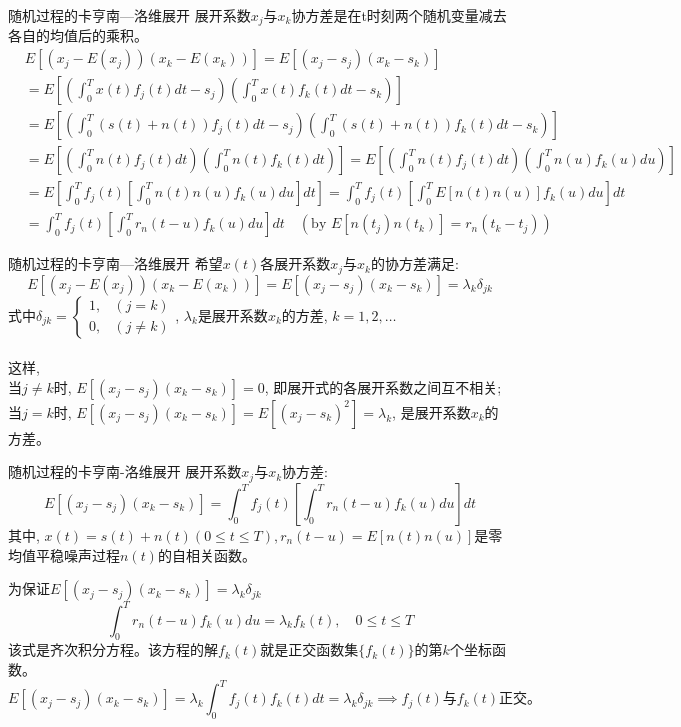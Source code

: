 \begin{frame}[shrink]{随机过程的卡亨南---洛维展开}
展开系数$x_j$与$x_k$协方差是在t时刻两个随机变量减去各自的均值后的乘积。
\begin{align*}
&E[(x_j-E(x_j))(x_k-E(x_k))]=E[(x_j-s_j)(x_k-s_k)]\\
&=E\left[\left(\int_{0}^{T}x(t)f_j(t)dt-s_j\right)\left(\int_{0}^{T}x(t)f_k(t)dt-s_k\right)\right]\\
&=E\left[\left(\int_{0}^{T}(s(t)+n(t))f_j(t)dt-s_j\right)\left(\int_{0}^{T}(s(t)+n(t))f_k(t)dt-s_k\right)\right]\\
&=E\left[\left(\int_{0}^{T}n(t)f_j(t)dt\right)\left(\int_{0}^{T}n(t)f_k(t)dt\right)\right]=E\left[\left(\int_{0}^{T}n(t)f_j(t)dt\right)\left(\int_{0}^{T}n(u)f_k(u)du\right)\right]\\
&=E\left[\int_{0}^{T}f_j(t)\left[\int_{0}^{T}n(t)n(u)f_k(u)du\right]dt\right]=\int_{0}^{T}f_j(t)\left[\int_{0}^{T}E[n(t)n(u)]f_k(u)du\right]dt\\
&=\int_{0}^{T}f_j(t)\left[\int_{0}^{T}r_n(t-u)f_k(u)du\right]dt\quad (\text{by }E[n(t_j)n(t_k)]=r_n(t_k-t_j))
\end{align*}
\end{frame}

\begin{frame}{随机过程的卡亨南---洛维展开}
希望$x(t)$各展开系数$x_j$与$x_k$的协方差满足:
\[E[(x_j-E(x_j))(x_k-E(x_k))]=E[(x_j-s_j)(x_k-s_k)]=\lambda_k\delta_{jk} \]
式中$\delta_{jk}=
\begin{cases}
1, & (j=k)\\
0, & (j\ne k)
\end{cases}$, \quad $\lambda_k$是展开系数$x_k$的方差, $k=1,2,\dots$\\
~\\
这样,\\
当$j\ne k$时, $E[(x_j-s_j)(x_k-s_k)]=0$, 即展开式的各展开系数之间互不相关;\\ 当$j=k$时, $E[(x_j-s_j)(x_k-s_k)]=E[(x_j-s_k)^2]=\lambda_k$, 是展开系数$x_k$的方差。
\end{frame}

\begin{frame}{随机过程的卡亨南-洛维展开}
展开系数$x_j$与$x_k$协方差:
\[E[(x_j-s_j)(x_k-s_k)]=\int_{0}^{T}f_j(t)\left[\int_{0}^{T}r_n(t-u)f_k(u)du\right]dt \]
其中, $x(t)=s(t)+n(t)(0\le t\le T),r_n(t-u)=E[n(t)n(u)]$是零均值平稳噪声过程$n(t)$的自相关函数。

为保证$E[(x_j-s_j)(x_k-s_k)]=\lambda_k\delta_{jk}$
\[\int_{0}^{T}r_n(t-u)f_k(u)du=\lambda_kf_k(t), \quad 0\le t\le T \]
该式是齐次积分方程。该方程的解$f_k(t)$就是正交函数集$\{f_k(t) \}$的第$k$个坐标函数。
\[ E[(x_j-s_j)(x_k-s_k)]=\lambda_k\int_{0}^{T}f_j(t)f_k(t)dt=\lambda_k\delta_{jk} \implies f_j(t)\text{与}f_k(t)\text{正交。}\] 
\end{frame}

